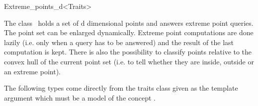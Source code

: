 \ccRefPageBegin


\begin{ccRefClass}{Extreme_points_d<Traits>}  %


\ccDefinition
  
The class \ccRefName\ holds a set of d dimensional points and answers extreme point queries. The point set can be 
enlarged dynamically. Extreme point computations are done lazily (i.e. only when a query has to be answered) and the result of the last computation is kept. There is also the possibility to classify points relative to the convex hull of the current point set (i.e. to tell whether they are inside, outside or an extreme point). 


% 

\ccTypes

The following types come directly from the traits class given as the template argument which must be a model of the concept .


\ccCreation %


\ccOperations


\end{ccRefClass}
